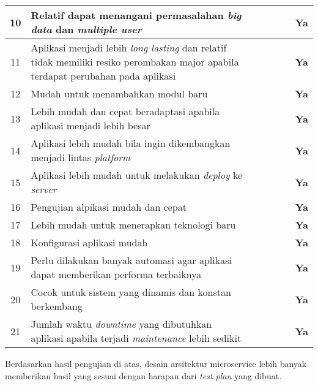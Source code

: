 \begin{adjustbox}{width=1\textwidth}
	\begin{tabular}{|p{1cm}|p{8.5cm}|p{1cm}|p{1cm}|p{1cm}|p{1cm}|p{1cm}|}
		\hline
		\multicolumn{1}{|c|}{10}&Relatif dapat menangani permasalahan \textit{big data} dan \textit{multiple user}&\checkmark&&&\checkmark&\multicolumn{1}{c|}{\textbf{Ya}}\\ \hline
		\multicolumn{1}{|c|}{11}&Aplikasi menjadi lebih \textit{long lasting} dan relatif tidak memiliki resiko perombakan major apabila terdapat perubahan pada aplikasi&\checkmark&&&\checkmark&\multicolumn{1}{c|}{\textbf{Ya}}\\ \hline
		\multicolumn{1}{|c|}{12}&Mudah untuk menambahkan modul baru&\checkmark&&\checkmark&&\multicolumn{1}{c|}{\textbf{Ya}}\\ \hline
		\multicolumn{1}{|c|}{13}&Lebih mudah dan cepat beradaptasi apabila aplikasi menjadi lebih besar&\checkmark&&&\checkmark&\multicolumn{1}{c|}{\textbf{Ya}}\\ \hline
		\multicolumn{1}{|c|}{14}&Aplikasi lebih mudah bila ingin dikembangkan menjadi lintas \textit{platform}&\checkmark&&&\checkmark&\multicolumn{1}{c|}{\textbf{Ya}}\\ \hline
		\multicolumn{1}{|c|}{15}&Aplikasi lebih mudah untuk melakukan \textit{deploy} ke \textit{server}&\checkmark&&&\checkmark&\multicolumn{1}{c|}{\textbf{Ya}}\\ \hline
		\multicolumn{1}{|c|}{16}&Pengujian alpikasi mudah dan cepat&\checkmark&&\checkmark&&\multicolumn{1}{c|}{\textbf{Ya}}\\ \hline
		\multicolumn{1}{|c|}{17}&Lebih mudah untuk menerapkan teknologi baru&\checkmark&&&\checkmark&\multicolumn{1}{c|}{\textbf{Ya}}\\ \hline
		\multicolumn{1}{|c|}{18}&Konfigurasi aplikasi mudah&&\checkmark&\checkmark&&\multicolumn{1}{c|}{\textbf{Ya}}\\ \hline
		\multicolumn{1}{|c|}{19}&Perlu dilakukan banyak automasi agar aplikasi dapat memberikan performa terbaiknya&&\checkmark&\checkmark&&\multicolumn{1}{c|}{\textbf{Ya}}\\ \hline
		\multicolumn{1}{|c|}{20}&Cocok untuk sistem yang dinamis dan konstan berkembang&\checkmark&&&\checkmark&\multicolumn{1}{c|}{\textbf{Ya}}\\ \hline
		\multicolumn{1}{|c|}{21}&Jumlah waktu \textit{downtime} yang dibutuhkan aplikasi apabila terjadi \textit{maintenance} lebih sedikit&\checkmark&&&\checkmark&\multicolumn{1}{c|}{\textbf{Ya}}\\ \hline
	\end{tabular}
\end{adjustbox}

Berdasarkan hasil pengujian di atas, desain arsitektur microservice lebih banyak memberikan hasil yang sesuai dengan harapan dari \textit{test plan} yang dibuat.
\newpage